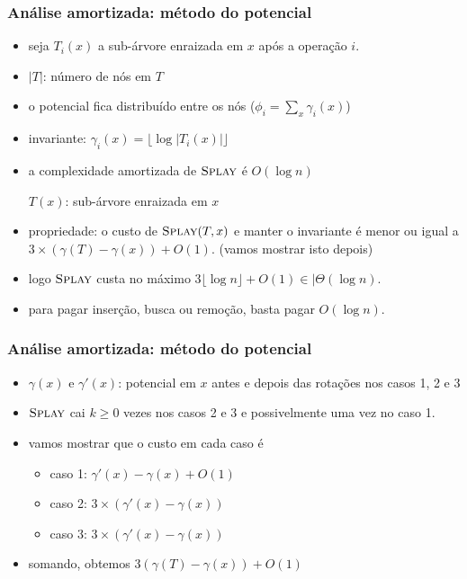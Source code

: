 \documentclass{beamer}
\begin{document}
\begin{frame}
\frametitle{Análise amortizada: método do potencial}
\begin{itemize}
\item seja $T_i(x)$ a sub-árvore enraizada em $x$ após a operação $i$.
\item $|T|$: número de nós em $T$
\item o potencial fica distribuído entre os nós ($\phi_i = \sum_x \gamma_i(x)$)
\item invariante: $\gamma_i(x) = \lfloor \log | T_i(x) | \rfloor$
\item a complexidade amortizada de $\textnormal{\scshape Splay}$ é $O(\log n)$

  $T(x)$: sub-árvore enraizada em $x$

\item propriedade: o custo de $\textnormal{\scshape Splay}(T, x)$ e manter o invariante
  é menor ou igual a $3 \times (\gamma(T) - \gamma(x)) + O(1)$. 
(\alert{vamos mostrar isto depois})
\item logo $\textnormal{\scshape Splay}$ custa no máximo $3 \lfloor \log n \rfloor + O(1) \in |\Theta(\log n)$.
\item para pagar inserção, busca ou remoção, basta pagar $O(\log n)$.
\end{itemize}
\end{frame}

\begin{frame}
\frametitle{Análise amortizada: método do potencial}
\begin{itemize}
\item $\gamma(x)$ e $\gamma'(x)$: potencial em $x$ antes e depois das rotações
  nos casos 1, 2 e 3
\item $\textnormal{\scshape Splay}$ cai $k \ge 0$ vezes nos casos 2 e 3 e possivelmente uma vez
  no caso 1.
\item vamos mostrar que o custo em cada caso é
\begin{itemize}
\item caso 1: $\gamma'(x) - \gamma(x) + O(1)$
\item caso 2: $3 \times(\gamma'(x) - \gamma(x))$
\item caso 3: $3 \times(\gamma'(x) - \gamma(x))$
\end{itemize}
\item somando, obtemos $3(\gamma(T) - \gamma(x)) + O(1)$

\end{itemize}
\end{frame}
\end{document}
